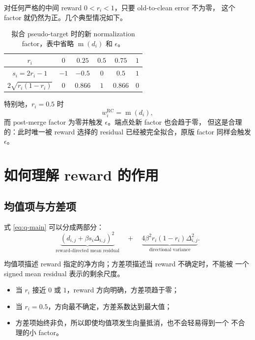 \documentclass[11pt,a4paper]{article}
\newcommand{\mabs}{\operatorname{m}}
\newcommand{\eps}{\epsilon}
\newcommand{\R}{\mathrm{RC}}
\begin{document}
对任何严格的中间 reward $0<r_i<1$，只要 old-to-clean error 不为零，
这个 factor 就仍然为正。几个典型情况如下。

\begin{table}[ht]
\centering
\small
\caption{拟合 pseudo-target 时的新 normalization factor，表中省略
$\mabs(d_i)$ 和 $\eps$。}
\begin{tabular}{cccccc}
\toprule
$r_i$ & $0$ & $0.25$ & $0.5$ & $0.75$ & $1$\\
\midrule
$s_i=2r_i-1$ & $-1$ & $-0.5$ & $0$ & $0.5$ & $1$\\
$2\sqrt{r_i(1-r_i)}$ & $0$ & $0.866$ & $1$ & $0.866$ & $0$\\
\bottomrule
\end{tabular}
\end{table}

特别地，$r_i=0.5$ 时
\begin{equation}
w_i^{\R}=\mabs(d_i),
\end{equation}
而 post-merge factor 为零并触发 $\eps$。端点处新 factor 也会趋于零，
但这是合理的：此时唯一被 reward 选择的 residual 已经被完全拟合，原版
factor 同样会触发 $\eps$。

\section{如何理解 reward 的作用}

\subsection{均值项与方差项}

式 \eqref{eq:q-main} 可以分成两部分：
\begin{equation}
\underbrace{
\left(d_{i,j}+\beta s_i\Delta_{i,j}\right)^2
}_{\text{reward-directed mean residual}}
\quad+\quad
\underbrace{
4\beta^2r_i(1-r_i)\Delta_{i,j}^2
}_{\text{directional variance}}.
\end{equation}

均值项描述 reward 指定的净方向；方差项描述当 reward 不确定时，不能被
一个 signed mean residual 表示的剩余尺度。
\begin{itemize}
  \item 当 $r_i$ 接近 $0$ 或 $1$，reward 方向明确，方差项趋于零；
  \item 当 $r_i=0.5$，方向最不确定，方差系数达到最大值；
  \item 方差项始终非负，所以即使均值项发生向量抵消，也不会轻易得到一个
  不合理的小 factor。
\end{itemize}
\end{document}
